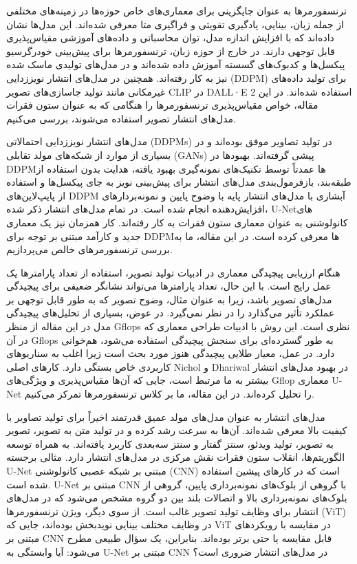 
\label{کارهای پیشین}
ترنسفورمرها به عنوان جایگزینی برای معماری‌های خاص حوزه‌ها در زمینه‌های مختلفی از جمله زبان، بینایی، یادگیری تقویتی و فراگیری متا معرفی شده‌اند. این مدل‌ها نشان داده‌اند که با افزایش اندازه مدل، توان محاسباتی و داده‌های آموزشی مقیاس‌پذیری قابل توجهی دارند. در خارج از حوزه زبان، ترنسفورمرها برای پیش‌بینی خودرگرسیو پیکسل‌ها و کدبوک‌های گسسته آموزش داده شده‌اند و در مدل‌های تولیدی ماسک شده نیز به کار رفته‌اند. همچنین در مدل‌های انتشار نویززدایی (DDPM) برای تولید داده‌های غیرمکانی مانند تولید جاسازی‌های تصویر CLIP در DALL·E 2 استفاده شده‌اند. در این مقاله، خواص مقیاس‌پذیری ترنسفورمرها را هنگامی که به عنوان ستون فقرات مدل‌های انتشار تصویر استفاده می‌شوند، بررسی می‌کنیم.

مدل‌های انتشار نویززدایی احتمالاتی (DDPMs) در تولید تصاویر موفق بوده‌اند و در بسیاری از موارد از شبکه‌های مولد تقابلی (GANs) پیشی گرفته‌اند. بهبودها در DDPMها عمدتاً توسط تکنیک‌های نمونه‌گیری بهبود یافته، هدایت بدون استفاده از طبقه‌بند، بازفرمول‌بندی مدل‌های انتشار برای پیش‌بینی نویز به جای پیکسل‌ها و استفاده از پایپ‌لاین‌های DDPM آبشاری با مدل‌های انتشار پایه با وضوح پایین و نمونه‌بردارهای افزایش‌دهنده انجام شده است. در تمام مدل‌های انتشار ذکر شده، U-Netهای کانولوشنی به عنوان معماری ستون فقرات به کار رفته‌اند. کار همزمان نیز یک معماری جدید و کارآمد مبتنی بر توجه برای DDPMها معرفی کرده است. در این مقاله، ما به بررسی ترنسفورمرهای خالص می‌پردازیم.

هنگام ارزیابی پیچیدگی معماری در ادبیات تولید تصویر، استفاده از تعداد پارامترها یک عمل رایج است. با این حال، تعداد پارامترها می‌تواند نشانگر ضعیفی برای پیچیدگی مدل‌های تصویر باشد، زیرا به عنوان مثال، وضوح تصویر که به طور قابل توجهی بر عملکرد تأثیر می‌گذارد را در نظر نمی‌گیرد. در عوض، بسیاری از تحلیل‌های پیچیدگی مدل در این مقاله از منظر Gflops نظری است. این روش با ادبیات طراحی معماری که در آن Gflops به طور گسترده‌ای برای سنجش پیچیدگی استفاده می‌شود، هم‌خوانی دارد. در عمل، معیار طلایی پیچیدگی هنوز مورد بحث است زیرا اغلب به سناریوهای کاربردی خاص بستگی دارد. کارهای اصلی Nichol و Dhariwal در بهبود مدل‌های انتشار بیشتر به ما مرتبط است، جایی که آن‌ها مقیاس‌پذیری و ویژگی‌های Gflop معماری U-Net را تحلیل کرده‌اند. در این مقاله، ما بر کلاس ترنسفورمرها تمرکز می‌کنیم.

مدل‌های انتشار به عنوان مدل‌های مولد عمیق قدرتمند اخیراً برای تولید تصاویر با کیفیت بالا معرفی شده‌اند. آن‌ها به سرعت رشد کرده و در تولید متن به تصویر، تصویر به تصویر، تولید ویدئو، سنتز گفتار و سنتز سه‌بعدی کاربرد یافته‌اند. به همراه توسعه الگوریتم‌ها، انقلاب ستون فقرات نقش مرکزی در مدل‌های انتشار دارد. مثالی برجسته U-Net مبتنی بر شبکه عصبی کانولوشنی (CNN) است که در کارهای پیشین استفاده شده است. U-Net مبتنی بر CNN با گروهی از بلوک‌های نمونه‌برداری پایین، گروهی از بلوک‌های نمونه‌برداری بالا و اتصالات بلند بین دو گروه مشخص می‌شود که در مدل‌های انتشار برای وظایف تولید تصویر غالب است. از سوی دیگر، ویژن ترنسفورمرها (ViT) در وظایف مختلف بینایی نویدبخش بوده‌اند، جایی که ViT در مقایسه با رویکردهای مبتنی بر CNN قابل مقایسه یا حتی برتر بوده‌اند. بنابراین، یک سؤال طبیعی مطرح می‌شود: آیا وابستگی به U-Net مبتنی بر CNN در مدل‌های انتشار ضروری است؟

